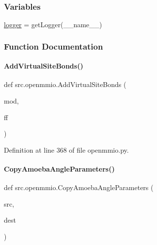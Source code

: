 \subsubsection*{Variables}
\begin{DoxyCompactItemize}
\item 
\hyperlink{namespacesrc_1_1openmmio_a6247d5e13d27a3110aac12d4d325347a}{logger} = get\+Logger(\+\_\+\+\_\+name\+\_\+\+\_\+)
\end{DoxyCompactItemize}


\subsubsection{Function Documentation}
\mbox{\label{namespacesrc_1_1openmmio_a67650529d4176645bc663bced5ac3c64}} 
\paragraph{\texorpdfstring{Add\+Virtual\+Site\+Bonds()}{AddVirtualSiteBonds()}}
{\footnotesize\ttfamily def src.\+openmmio.\+Add\+Virtual\+Site\+Bonds (\begin{DoxyParamCaption}\item[{}]{mod,  }\item[{}]{ff }\end{DoxyParamCaption})}



Definition at line 368 of file openmmio.\+py.

\mbox{\label{namespacesrc_1_1openmmio_a9dc2514058421b3874712cfa3a745467}} 
\paragraph{\texorpdfstring{Copy\+Amoeba\+Angle\+Parameters()}{CopyAmoebaAngleParameters()}}
{\footnotesize\ttfamily def src.\+openmmio.\+Copy\+Amoeba\+Angle\+Parameters (\begin{DoxyParamCaption}\item[{}]{src,  }\item[{}]{dest }\end{DoxyParamCaption})}



